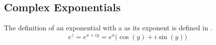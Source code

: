 \subsection{Complex Exponentials}\label{subsec:Complex_Exponentials}
The definition of an exponential with a  as its exponent is defined in .
\begin{equation}\label{eq:Complex_Exponential}
  e^{z} = e^{x + iy} = e^{x} \bigl( \cos(y) + i \sin(y) \bigr)
\end{equation}


